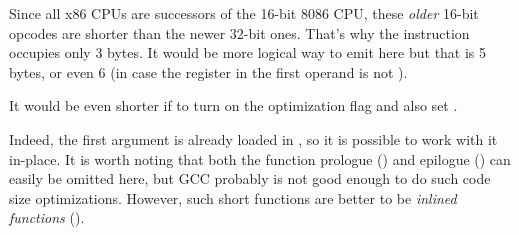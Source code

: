 Since all x86 CPUs are successors of the 16-bit 8086 CPU, these \emph{older} 16-bit opcodes are shorter 
than the newer 32-bit ones.
That's why the  instruction occupies only 3 bytes.
It would be more logical way to emit here 
but that is 5 bytes, or even 6
(in case the register in the first operand is not \EAX).


It would be even shorter if to turn on the \Othree optimization flag and also set .




Indeed, the first argument is already loaded in \EAX, so it is possible to work with it in-place.
It is worth noting that both the function prologue () and epilogue ()
can easily be omitted here, but GCC probably is not good enough to do such code size optimizations.
However, such short functions are better to be \emph{inlined functions} ().
